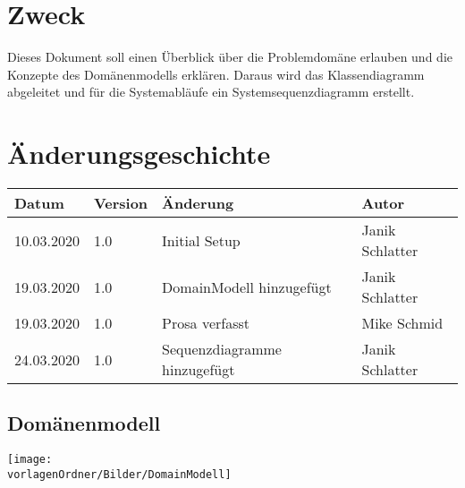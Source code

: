 \documentclass[
	ngerman,
	toc=listof, %
	toc=bibliography, %
	footnotes=multiple, %
	parskip=half, %
	numbers=noendperiod %
]{scrartcl}
\newcommand{\vorlagenOrdner}{../../99_Vorlagen} %
\begin{document}
\thispagestyle{plain}

\cleardoublepage


\section*{Zweck}
Dieses Dokument soll einen Überblick über die Problemdomäne erlauben und die Konzepte des Domänenmodells erklären.
Daraus wird das Klassendiagramm abgeleitet und für die Systemabläufe ein Systemsequenzdiagramm erstellt.

\section*{Änderungsgeschichte}
\begin{tabularx}{\textwidth}{llXl}
	\toprule
	Datum & Version & Änderung & Autor \\
	\midrule
	10.03.2020 & 1.0 & Initial Setup & Janik Schlatter \\
	19.03.2020 & 1.0 & DomainModell hinzugefügt & Janik Schlatter \\
	19.03.2020 & 1.0 & Prosa verfasst & Mike Schmid \\
	24.03.2020 & 1.0 & Sequenzdiagramme hinzugefügt & Janik Schlatter \\

	\bottomrule
\end{tabularx}
\cleardoublepage

{}
\tableofcontents
\cleardoublepage

\let\stdsection\section
\renewcommand\section{\clearpage\stdsection}

\begin{landscape}
	\section{Domänenmodell}
	\texttt{[image: \\vorlagenOrdner/Bilder/DomainModell]}
	\newpage	
\end{landscape}
\end{document}
